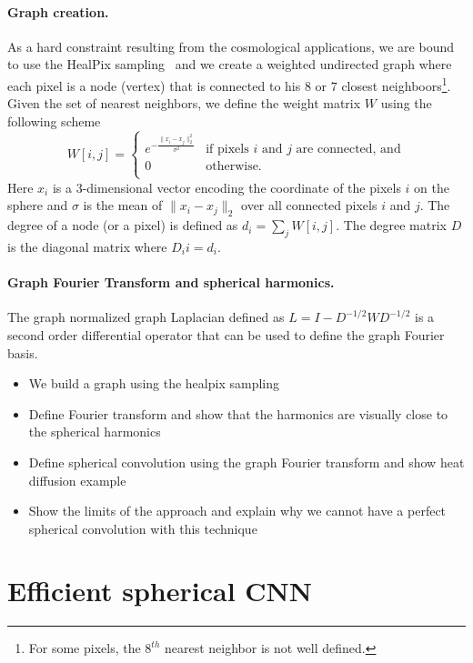 \documentclass[preprint,12pt,authoryear]{elsarticle}
\newcommand{\assign}[1]{{\color[rgb]{.8,.5,.8}{Assigned: #1 }}}
\begin{document}
\paragraph{Graph creation.}
As a hard constraint resulting from the cosmological applications, we are bound to use the HealPix sampling~\cite{gorski2005healpix} and we create a weighted undirected graph where each pixel is a node (vertex) that is connected to his $8$ or $7$ closest neighboors\footnote{For some pixels, the $8^{th}$ nearest neighbor is not well defined.}. Given the set of nearest neighbors, we define the weight matrix $W$ using the following scheme
\begin{equation}
W[i,j]=\begin{cases}
e^{-\frac{\|x_i-x_j\|_2^2}{\sigma^2}} & \text{if pixels $i$ and $j$ are connected, and}\\
0 & \text{otherwise.}\\
\end{cases}
\end{equation}
Here $x_i$ is a 3-dimensional vector encoding the coordinate of the pixels $i$ on the sphere and $\sigma$ is the mean of $\|x_i-x_j\|_2$ over all connected pixels $i$ and $j$. The degree of a node (or a pixel) is defined as $d_i = \sum_j W[i,j]$. The degree matrix $D$ is the diagonal matrix where $D_ii=d_i$.

\paragraph{Graph Fourier Transform and spherical harmonics.}
The graph normalized graph Laplacian defined as $L = I - D^{-1/2} W D^{-1/2}$ is a second order differential operator that can be used to define the graph Fourier basis. 
 
\begin{itemize}
	\item We build a graph using the healpix sampling
	\item Define Fourier transform and show that the harmonics are visually close to the spherical harmonics
	\item Define spherical convolution using the graph Fourier transform and show heat diffusion example
	\item Show the limits of the approach and explain why we cannot have a perfect spherical convolution with this technique
\end{itemize}

\section{Efficient spherical CNN}
\assign{Michael}
\end{document}
